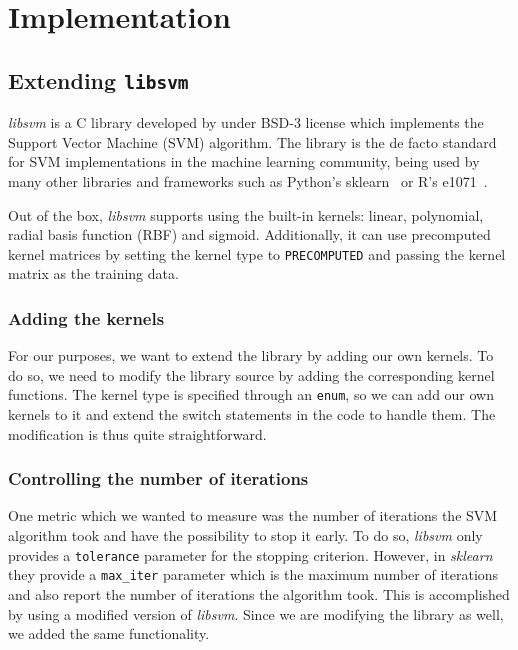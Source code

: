 \chapter{Implementation}
\label{sec:implementation}

\section{Extending \texttt{libsvm}}

\emph{libsvm} is a C library developed by \textcite{CC01a} under BSD-3 license which implements the
Support Vector Machine (SVM) algorithm. The library is the de facto standard for SVM implementations in
the machine learning community, being used by many other libraries and frameworks such as
Python's sklearn~\cite{ScikitlearnScikitlearn2023} or R's e1071~\cite{meyer[autE1071MiscFunctions2023}.

Out of the box, \emph{libsvm} supports using the built-in kernels: linear, polynomial,
radial basis function (RBF) and sigmoid. Additionally, it can use precomputed kernel matrices
by setting the kernel type to \texttt{PRECOMPUTED} and passing the kernel matrix as the
training data.

\subsection{Adding the kernels}

For our purposes, we want to extend the library by adding our own kernels. To do so, we
need to modify the library source by adding the corresponding kernel functions. The kernel
type is specified through an \texttt{enum}, so we can add our own kernels to it and extend the
switch statements in the code to handle them. The modification is thus quite straightforward.

\subsection{Controlling the number of iterations}

One metric which we wanted to measure was the number of iterations the SVM algorithm took
and have the possibility to stop it early. To do so, \emph{libsvm} only provides a
\texttt{tolerance} parameter for the stopping criterion. However, in \emph{sklearn}
they provide a \texttt{max\_iter} parameter which is the maximum number of iterations
and also report the number of iterations the algorithm took. This is accomplished by 
using a modified version of \emph{libsvm}. Since we are modifying the library as well,
we added the same functionality.

